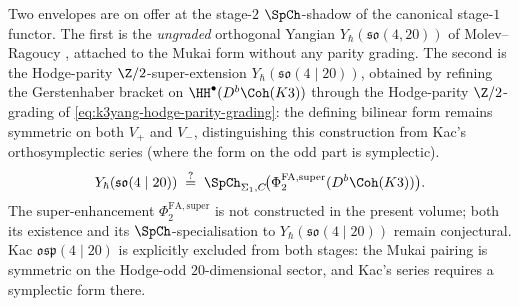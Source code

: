 \begin{remark}
\label{rem:k3y-stage-super-yangian-scope}
Two envelopes are on offer at the stage-$2$ $\SpCh$-shadow of the
canonical stage-$1$ functor. The first is the \emph{ungraded} orthogonal
Yangian $Y_\hbar(\mathfrak{so}(4, 20))$ of Molev--Ragoucy
\cite{MolevRagoucy2008}, attached to the Mukai form without any parity
grading. The second is the Hodge-parity
$\Z/2$-super-extension $Y_\hbar(\mathfrak{so}(4 \mid 20))$, obtained by
refining the Gerstenhaber bracket on $\HH^\bullet(D^b\Coh(K3))$ through
the Hodge-parity $\Z/2$-grading of
\eqref{eq:k3yang-hodge-parity-grading}: the defining bilinear form
remains symmetric on both $V_+$ and $V_-$, distinguishing this
construction from Kac's orthosymplectic series (where the form on the
odd part is symplectic).
\[
 Y_\hbar(\mathfrak{so}(4 \mid 20))
 \;\stackrel{?}{=}\;
 \SpCh_{\Sigma_1, C}\!\bigl(\Phi^{\mathrm{FA}, \mathrm{super}}_2(D^b\Coh(K3))\bigr).
\]
The super-enhancement $\Phi^{\mathrm{FA}, \mathrm{super}}_2$ is not
constructed in the present volume; both its existence and its
$\SpCh$-specialisation to $Y_\hbar(\mathfrak{so}(4 \mid 20))$ remain
conjectural. Kac $\mathfrak{osp}(4 \mid 20)$ is explicitly excluded
from both stages: the Mukai pairing is symmetric on the Hodge-odd
$20$-dimensional sector, and Kac's series requires a symplectic form
there.
\end{remark}

